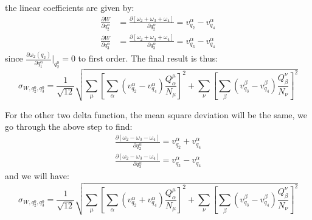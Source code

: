 \documentclass{article}
\newcommand{\pfrac}[2]{\frac{\partial #1}{\partial #2}}
\begin{document}
the linear coefficients are given by:
\begin{align}
    \pfrac{W}{q_2^{\alpha}} &= \frac{ \partial \left[ \omega_2 + \omega_3 + \omega_4 \right] }{\partial q_2^{\alpha}} 
                          = v_{q_2}^{\alpha} - v_{q_4}^{\alpha} \\
    \pfrac{W}{q_3^{\alpha}} &= \frac{ \partial \left[ \omega_2 + \omega_3 + \omega_4 \right] }{\partial q_3^{\alpha}} 
                          = v_{q_3}^{\alpha} - v_{q_4}^{\alpha}
\end{align}
since $\frac{\partial \omega_2(q_2)}{\partial q_1^{\alpha}}\bigg|_{q_2^0} = 0$ to first order.
The final result is thus:
\begin{equation}
    \sigma_{W,q_2^0,q_3^0} = \frac{1}{\sqrt{12}} 
        \sqrt{ \sum_\mu \left[ \sum_{\alpha}\left( v_{q_2}^{\alpha} - v_{q_4}^{\alpha} \right) \frac{Q_{\alpha}^{\mu}}{ N_{\mu}}  \right]^2 
             + \sum_\nu \left[ \sum_{\beta}\left( v_{q_3}^{\beta} - v_{q_4}^{\beta} \right) \frac{Q_{\beta}^{\nu}}{ N_{\nu}}  \right]^2  } 
\end{equation}

For the other two delta function, the mean square deviation will be the same, we go through the above step to find:
\begin{align}
    \frac{ \partial \left[ \omega_2 - \omega_3 - \omega_4 \right] }{\partial q_2^{\alpha}} 
                          = v_{q_2}^{\alpha} + v_{q_4}^{\alpha} \\
    \frac{ \partial \left[ \omega_2 - \omega_3 - \omega_4 \right] }{\partial q_3^{\alpha}} 
                          = v_{q_3}^{\alpha} - v_{q_4}^{\alpha}
\end{align}
and we will have:
\begin{equation}
    \sigma_{W,q_2^0,q_3^0} = \frac{1}{\sqrt{12}} 
        \sqrt{ \sum_\mu \left[ \sum_{\alpha}\left( v_{q_2}^{\alpha} + v_{q_4}^{\alpha} \right) \frac{Q_{\alpha}^{\mu}}{ N_{\mu}}  \right]^2 
             + \sum_\nu \left[ \sum_{\beta}\left( v_{q_3}^{\beta} - v_{q_4}^{\beta} \right) \frac{Q_{\beta}^{\nu}}{ N_{\nu}}  \right]^2  } 
\end{equation}
\end{document}
